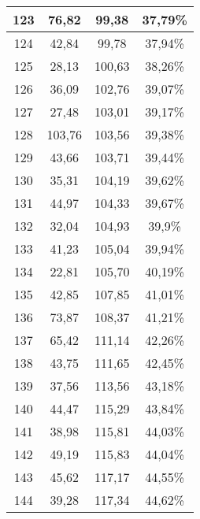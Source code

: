 \begin{longtable}{|c|c|c|c|}
	123 & 76,82 & 99,38 & 37,79\% \\ \hline
	124 & 42,84 & 99,78 & 37,94\% \\ \hline
	125 & 28,13 & 100,63 & 38,26\% \\ \hline
	126 & 36,09 & 102,76 & 39,07\% \\ \hline
	127 & 27,48 & 103,01 & 39,17\% \\ \hline
	128 & 103,76 & 103,56 & 39,38\% \\ \hline
	129 & 43,66 & 103,71 & 39,44\% \\ \hline
	130 & 35,31 & 104,19 & 39,62\% \\ \hline
	131 & 44,97 & 104,33 & 39,67\% \\ \hline
	132 & 32,04 & 104,93 & 39,9\% \\ \hline
	133 & 41,23 & 105,04 & 39,94\% \\ \hline
	134 & 22,81 & 105,70 & 40,19\% \\ \hline
	135 & 42,85 & 107,85 & 41,01\% \\ \hline
	136 & 73,87 & 108,37 & 41,21\% \\ \hline
	137 & 65,42 & 111,14 & 42,26\% \\ \hline
	138 & 43,75 & 111,65 & 42,45\% \\ \hline
	139 & 37,56 & 113,56 & 43,18\% \\ \hline
	140 & 44,47 & 115,29 & 43,84\% \\ \hline
	141 & 38,98 & 115,81 & 44,03\% \\ \hline
	142 & 49,19 & 115,83 & 44,04\% \\ \hline
	143 & 45,62 & 117,17 & 44,55\% \\ \hline
	144 & 39,28 & 117,34 & 44,62\% \\ \hline
	\end{longtable}
\normalsize

